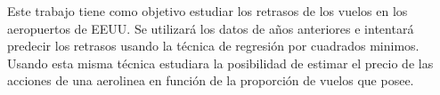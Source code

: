 Este trabajo tiene como objetivo estudiar los retrasos de los vuelos en los aeropuertos de EEUU\@.
Se utilizar\'a los datos de a\~nos anteriores e intentar\'a predecir los retrasos usando la t\'ecnica
de regresi\'on por cuadrados minimos.
Usando esta misma t\'ecnica estudiara la posibilidad de estimar el precio de las acciones de una aerolinea
en funci\'on de la proporci\'on de vuelos que posee.
